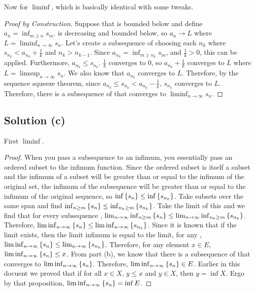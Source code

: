 \documentclass[11pt]{article}
\begin{document}
        Now for $\liminf$, which is basically identical with some tweaks.
        \begin{proof}[Proof by Construction]
            Suppose that  is bounded below and define $a_n = \inf_{m \geq n} s_m$.
             is decreasing and bounded below, so $a_n \to L$ where $L = \liminf_{n \to \infty} s_n$.
            Let's create a subsequence of  choosing each $n_k$ where $s_{n_k} < a_{n_k} + \frac{1}{k}$ and $n_k > n_{k - 1}$.
            Since $a_{n_k} = \inf_{m \geq n_k} s_m$, and $\frac{1}{k} > 0$, this can be applied.
            Furthermore, $a_{n_k} \leq s_{n_k}$.
            $\frac{1}{k}$ converges to $0$, so $a_{n_k} + \frac{1}{k}$ converges to $L$ where $L = \limsup_{n \to \infty} s_n$.
            We also know that $a_{n_k}$ converges to $L$.
            Therefore, by the sequence squeeze theorem, since $a_{n_k} \leq s_{n_k} < a_{n_k} - \frac{1}{k}$, $s_{n_k}$ converges to $L$.
            Therefore, there is a subsequence of  that converges to $\liminf_{n \to \infty} s_n$.
        \end{proof}

    \subsection{Solution (c)}
        First $\liminf$.
        \begin{proof}
            When you pass a subsequence to an infimum, you essentially pass an ordered subset to the infimum function.
            Since the ordered subset is itself a subset and the infimum of a subset will be greater than or equal to the infimum of the original set, the infimum of the subsequence will be greater than or equal to the infimum of the original sequence, so $\inf\seq{s} \leq \inf\seq[n_k]{s}$.
            Take subsets over the same span and find $\inf_{n \geq m}\seq{s} \leq \inf_{n_k \geq m}\seq[n_k]{s}$.
            Take the limit of this and we find that for every subsequence , $\lim_{n \to \infty} \inf_{n \geq m}\seq{s} \leq \lim_{n \to \infty} \inf_{n_k \geq m}\seq[n_k]{s}$.
            Therefore, $\liminf_{n \to \infty}\seq{s} \leq \liminf_{n \to \infty}\seq[n_k]{s}$.
            Since it is known that if the limit exists, then the limit infimum is equal to the limit, for any , $\liminf_{n \to \infty}\seq{s} \leq \lim_{n \to \infty}\seq[n_k]{s}$.
            Therefore, for any element $x \in E$, $\liminf_{n \to \infty}\seq{s} \leq x$.
            From part (b), we know that there is a subsequence of  that converges to $\liminf_{n \to \infty}\seq{s}$.
            Therefore, $\liminf_{n \to \infty}\seq{s} \in E$.
            Earlier in this docuent we proved that if for all $x \in X$, $y \leq x$ and $y \in X$, then $y = \inf X$.
            Ergo by that proposition, $\liminf_{n \to \infty}\seq{s} = \inf E$.
        \end{proof}
\end{document}

